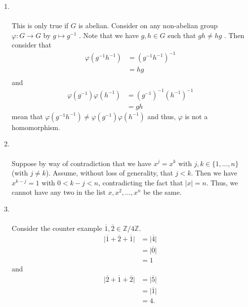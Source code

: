 \documentclass[12 pt, letterpaper]{hmcpset}
\begin{document}
\begin{solution}
\begin{enumerate}
		\item {} \\\\
			This is only true if $G$ is abelian. Consider on any non-abelian group  $\varphi : G \to G$  by $g \mapsto g^{-1}$ . Note that we have $g, h \in G$  such that $g h \neq h g$ . Then consider that
			\[
				\begin{split}
					\varphi(g^{-1} h^{-1}) & = (g^{-1} h^{-1})^{-1} \\
							       & = hg \\
				\end{split}
			\]
			and
			\[
				\begin{split}
					\varphi(g^{-1}) \varphi(h^{-1}) & = (g^{-1})^{-1} (h^{-1})^{-1} \\
									& = gh
				\end{split}
			\]
			mean that $\varphi(g^{-1} h^{-1}) \neq \varphi(g^{-1}) \varphi(h^{-1})$ and thus, $\varphi$ is not a homomorphism.
		\item {} \\\\
			Suppose by way of contradiction that we have $x^{j} = x^{k}$ with $j, k \in \{ 1, \dots, n \}$ (with $j \neq k$). Assume, without loss of generality, that $j < k$. Then we have $x^{k - j} = 1$ with $0< k - j < n$, contradicting the fact that $\vert x \vert = n$. Thus, we cannot have any two in the list $x, x^{2}, \dots, x^{n}$ be the same.
		\item {} \\\\
			Consider the counter example $\overline{1}, \overline{2} \in \mathbb{Z}/4\mathbb{Z}$. 
			\[
				\begin{split}
					\vert \overline{1} + \overline{2} + \overline{1} \vert & = \vert \overline{4} \vert \\
											       & = \vert \overline{0} \vert \\
											       & = 1
				\end{split}
			\]
			and
			\[
				\begin{split}
					\vert \overline{2} + \overline{1} + \overline{2} \vert & = \vert \overline{5} \vert \\
											       & = \vert \overline{1} \vert \\
											       & = 4.
				\end{split}
			\]
	\end{enumerate}
\end{solution}
\end{document}
